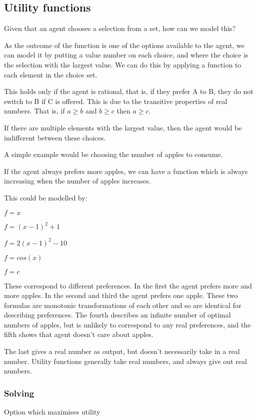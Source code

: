 
\subsection{Utility functions}

Given that an agent chooses a selection from a set, how can we model this?

As the outcome of the function is one of the options available to the agent, we can model it by putting a value number on each choice, and where the choice is the selection with the largest value. We can do this by applying a function to each element in the choice set.

This holds only if the agent is rational, that is, if they prefer A to B, they do not switch to B if C is offered. This is due to the transitive properties of real numbers. That is, if \(a\ge b\) and \(b\ge c\) then \(a\ge c\).

If there are multiple elements with the largest value, then the agent would be indifferent between these choices.

A simple example would be choosing the number of apples to consume.

If the agent always prefers more apples, we can have a function which is always increasing when the number of apples increases.

This could be modelled by:

\(f=x\)

\(f=(x-1)^2+1\)

\(f=2(x-1)^2-10\)

\(f=cos(x)\)

\(f=c\)

These correspond to different preferences. In the first the agent prefers more and more apples. In the second and third the agent prefers one apple. These two formulas are monotonic transformations of each other and so are identical for describing preferences. The fourth describes an infinite number of optimal numbers of apples, but is unlikely to correspond to any real preferences, and the fifth shows that agent doesn’t care about apples.

The last gives a real number as output, but doesn’t necessarily take in a real number. Utility functions generally take real numbers, and always give out real numbers.

\subsubsection{Solving}

Option which maximises utility


